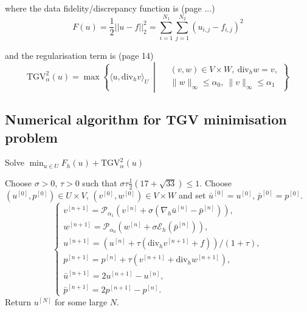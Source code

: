 \documentclass{article}
\begin{document}
where
the data fidelity/discrepancy function is (page ...)
\begin{equation}
    F(u) = \frac{1}{2} || u - f ||^2_2 = \sum_{i=1}^{N_1} \sum_{j=1}^{N_2} (u_{i,j} - f_{i,j})^2
\end{equation}

and
the regularisation term is (page 14)
\begin{equation}
    \mathrm{TGV}^2_\alpha(u) = \max \left\{ \langle u, \mathrm{div}_h v \rangle_U \ \middle| \ 
    \begin{aligned}
    &(v, w) \in V \times W, \ \mathrm{div}_h w = v, \\
    &\|w\|_\infty \leq \alpha_0, \ \|v\|_\infty \leq \alpha_1 
    \end{aligned}
    \right\}
\end{equation}



\subsection{
Numerical
algorithm for TGV minimisation problem
}


\begin{algorithm}[H]
    \caption{Solve $\min_{u \in U} F_h(u) + \mathrm{TGV}^2_{\alpha}(u)$}
    \begin{algorithmic}[1]
    \State Choose $\sigma > 0$, $\tau > 0$ such that $\sigma \tau \frac{1}{2} (17 + \sqrt{33}) \leq 1$.
    \State Choose $(u^{[0]}, p^{[0]}) \in U \times V$, $(v^{[0]}, w^{[0]}) \in V \times W$ and set $\bar{u}^{[0]} = u^{[0]}$, $\bar{p}^{[0]} = p^{[0]}$.
    \For {$n = 0, 1, 2, \ldots$}
        \State \begin{equation*}
        \begin{cases}
        v^{[n+1]} = \mathcal{P}_{\alpha_1} \left( v^{[n]} + \sigma (\nabla_h \bar{u}^{[n]} - \bar{p}^{[n]}) \right), \\
        w^{[n+1]} = \mathcal{P}_{\alpha_0} \left( w^{[n]} + \sigma \mathcal{E}_h (\bar{p}^{[n]}) \right), \\
        u^{[n+1]} = \left( u^{[n]} + \tau (\text{div}_h v^{[n+1]} + f) \right) / ( 1 + \tau ), \\
        p^{[n+1]} = p^{[n]} + \tau (v^{[n+1]} + \text{div}_h w^{[n+1]}), \\
        \bar{u}^{[n+1]} = 2u^{[n+1]} - u^{[n]}, \\
        \bar{p}^{[n+1]} = 2p^{[n+1]} - p^{[n]}.
        \end{cases}
        \end{equation*}
    \EndFor
    \State Return $u^{[N]}$ for some large $N$.
    \end{algorithmic}
    \label{alg:pdhg}
\end{algorithm}
\end{document}
